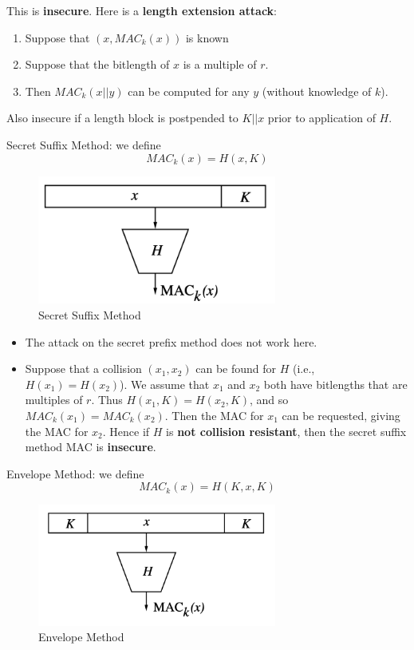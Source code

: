 \documentclass[12pt,titlepage]{article}
\begin{document}
This is \textbf{insecure}. Here is a \textbf{length extension attack}: \begin{enumerate}
\item Suppose that $(x, MAC_k (x))$ is known
\item Suppose that the bitlength of $x$ is a multiple of $r$.
\item Then $MAC_k (x || y)$ can be computed for any $y$ (without knowledge of $k$).
\end{enumerate}
Also insecure if a length block is postpended to $K || x$ prior to application of $H$.

Secret Suffix Method: we define $$MAC_k (x) = H(x, K)$$

\begin{center}
	\begin{figure}[h!]
		\centering
		\includegraphics[width=0.7\textwidth]{Secret_Suffix_Method.png}
		\caption{Secret Suffix Method}
	\end{figure}
\end{center}

\begin{itemize}
	\item The attack on the secret prefix method does not work here.
	\item Suppose that a collision $(x_1 , x_2)$ can be found for $H$ (i.e., $H(x_1) = H(x_2)$). We assume that $x_1$ and $x_2$ both have bitlengths that are multiples of $r$. Thus $H(x_1, K) = H(x_2 , K)$, and so $MAC_k (x_1) = MAC_k (x_2)$. Then the MAC for $x_1$ can be requested, giving the MAC for $x_2$. Hence if $H$ is \textbf{not collision resistant}, then the secret suffix method MAC is \textbf{insecure}.
\end{itemize}

Envelope Method: we define $$MAC_k (x) = H(K, x, K)$$

\begin{center}
	\begin{figure}[h!]
		\centering
		\includegraphics[width=0.7\textwidth]{Envelope_Method.png}
		\caption{Envelope Method}
	\end{figure}
\end{center}
\end{document}
